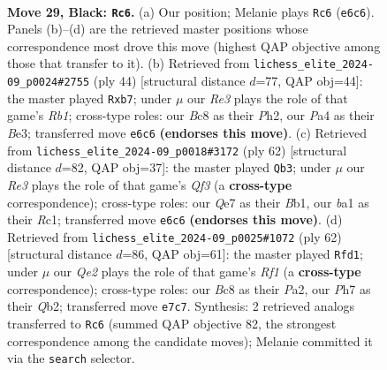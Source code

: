 \documentclass[11pt]{article}
\begin{document}
\clearpage

\begin{figure}[p]\centering
\begin{subfigure}{0.46\textwidth}\centering
\resizebox{\linewidth}{!}{%
\newchessgame
\chessboard[
  setfen={r1b3k1/1p2q2p/4r3/1R3Qp1/p1N1n3/4P1P1/P4PKP/B3R3 b - - 0 29},
  showmover=false,
  pgfstyle=straightmove, color=movearrow, markmove={e6-c6}
]}
\caption{}
\end{subfigure}\hfill
\begin{subfigure}{0.46\textwidth}\centering
\resizebox{\linewidth}{!}{%
\newchessgame
\chessboard[
  setfen={2r1k1r1/pp3p2/2n1p2p/3pP3/3P3b/4B3/q1N2P1P/1R1Q1R1K w - - 0 23},
  showmover=false,
  pgfstyle=straightmove, color=movearrow, markmove={b1-b7}
]}
\caption{}
\end{subfigure}
\\[4pt]
\begin{subfigure}{0.46\textwidth}\centering
\resizebox{\linewidth}{!}{%
\newchessgame
\chessboard[
  setfen={r2rb3/1p3pk1/6pp/1P3q1P/1n1pN3/5Q2/5PP1/1BR1R1K1 w - - 2 32},
  showmover=false,
  pgfstyle=straightmove, color=movearrow, markmove={f3-b3}
]}
\caption{}
\end{subfigure}\hfill
\begin{subfigure}{0.46\textwidth}\centering
\resizebox{\linewidth}{!}{%
\newchessgame
\chessboard[
  setfen={4r3/pp3rpk/2b4p/2qN1p2/2PRn2P/6PB/PQ3P2/5RK1 w - - 11 32},
  showmover=false,
  pgfstyle=straightmove, color=movearrow, markmove={f1-d1}
]}
\caption{}
\end{subfigure}
\caption{\textbf{Move 29, Black: \texttt{Rc6}.} (a) Our position; Melanie plays \texttt{Rc6} (\texttt{e6c6}). Panels (b)--(d) are the retrieved master positions whose correspondence most drove this move (highest QAP objective among those that transfer to it). (b) Retrieved from \texttt{lichess\_elite\_2024-09\_p0024\#2755} (ply 44) [structural distance $d$=77, QAP obj=44]: the master played \texttt{Rxb7}; under $\mu$ our \emph{Re3} plays the role of that game's \emph{Rb1}; cross-type roles: our \emph{B}c8 as their \emph{P}h2, our \emph{P}a4 as their \emph{B}e3; transferred move \texttt{e6c6} \textbf{(endorses this move)}. (c) Retrieved from \texttt{lichess\_elite\_2024-09\_p0018\#3172} (ply 62) [structural distance $d$=82, QAP obj=37]: the master played \texttt{Qb3}; under $\mu$ our \emph{Re3} plays the role of that game's \emph{Qf3} (a \textbf{cross-type} correspondence); cross-type roles: our \emph{Q}e7 as their \emph{B}b1, our \emph{b}a1 as their \emph{R}c1; transferred move \texttt{e6c6} \textbf{(endorses this move)}. (d) Retrieved from \texttt{lichess\_elite\_2024-09\_p0025\#1072} (ply 62) [structural distance $d$=86, QAP obj=61]: the master played \texttt{Rfd1}; under $\mu$ our \emph{Qe2} plays the role of that game's \emph{Rf1} (a \textbf{cross-type} correspondence); cross-type roles: our \emph{B}c8 as their \emph{P}a2, our \emph{P}h7 as their \emph{Q}b2; transferred move \texttt{e7c7}. Synthesis: 2 retrieved analogs transferred to \texttt{Rc6} (summed QAP objective 82, the strongest correspondence among the candidate moves); Melanie committed it via the \texttt{search} selector.}
\label{fig:thought-m57}
\end{figure}
\end{document}

